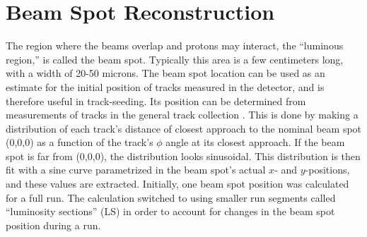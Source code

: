 


\section{Beam Spot Reconstruction}
\label{evReco:BS}
The region where the beams overlap and protons may interact, 
the ``luminous region,'' is called the beam spot.  
Typically this area is a few centimeters long, 
with a width of 20-50 microns.  %
The beam spot location can be used as an estimate 
for the initial position of tracks measured in the detector, 
and is therefore useful in track-seeding.  
Its position %
can be determined from measurements of tracks in the 
general track collection 
\cite{CMS-NOTE-2007-021}.  
This is done by making a distribution of each track's distance of 
closest approach to the nominal beam spot (0,0,0) 
as a function of the track's $\phi$ angle at its 
closest approach.  
If the beam spot is far from (0,0,0), 
the distribution looks sinusoidal.  
This distribution is then fit with a sine curve 
parametrized in the beam spot's actual 
$x$- and $y$-positions, 
and these values are extracted.  
Initially, one beam spot position was calculated    %
for a full run.  
The calculation switched to using smaller run segments 
called ``luminosity sections'' (LS) 
in order to account for changes in the beam spot position 
during a run.  

